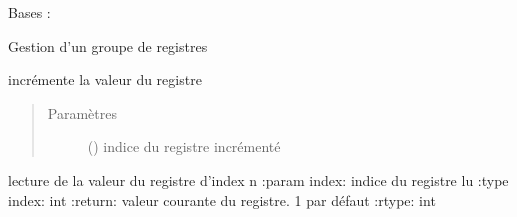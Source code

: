 \documentclass[letterpaper,10pt,french]{sphinxmanual}
\begin{document}

\begin{fulllineitems}
\label{\detokenize{executeurcomponents:executeurcomponents.RegisterGroup}}
Bases : {\hyperref[\detokenize{executeurcomponents:executeurcomponents.BaseComponent}]{}}

Gestion d’un groupe de registres

\begin{fulllineitems}
\label{\detokenize{executeurcomponents:executeurcomponents.RegisterGroup.content}}
\end{fulllineitems}


\begin{fulllineitems}
\label{\detokenize{executeurcomponents:executeurcomponents.RegisterGroup.inc}}
incrémente la valeur du registre
\begin{quote}\begin{description}
\item[{Paramètres}] \leavevmode
{} () \textendash{} indice du registre incrémenté

\end{description}\end{quote}

\end{fulllineitems}


\begin{fulllineitems}
\label{\detokenize{executeurcomponents:executeurcomponents.RegisterGroup.read}}
lecture de la valeur du registre d’index n
:param index: indice du registre lu
:type index: int
:return: valeur courante du registre. \sphinxhyphen{}1 par défaut
:rtype: int


\end{fulllineitems}
\end{fulllineitems}
\end{document}
